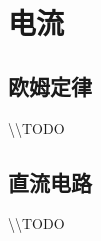 
\section{电流}

\subsection{欧姆定律}

\textbackslash\textbackslash TODO

\subsection{直流电路}

\textbackslash\textbackslash TODO
